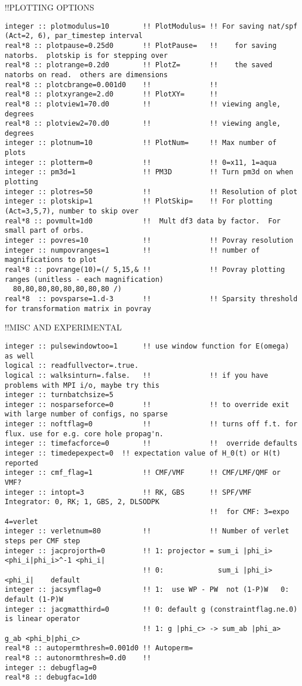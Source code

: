 !!{\large \quad PLOTTING OPTIONS }
\begin{verbatim}
integer :: plotmodulus=10        !! PlotModulus= !! For saving nat/spf (Act=2, 6), par_timestep interval
real*8 :: plotpause=0.25d0       !! PlotPause=   !!    for saving natorbs.  plotskip is for stepping over
real*8 :: plotrange=0.2d0        !! PlotZ=       !!    the saved natorbs on read.  others are dimensions
real*8 :: plotcbrange=0.001d0    !!              !!    
real*8 :: plotxyrange=2.d0       !! PlotXY=      !!    
real*8 :: plotview1=70.d0        !!              !! viewing angle, degrees
real*8 :: plotview2=70.d0        !!              !! viewing angle, degrees
integer :: plotnum=10            !! PlotNum=     !! Max number of plots
integer :: plotterm=0            !!              !! 0=x11, 1=aqua
integer :: pm3d=1                !! PM3D         !! Turn pm3d on when plotting
integer :: plotres=50            !!              !! Resolution of plot
integer :: plotskip=1            !! PlotSkip=    !! For plotting (Act=3,5,7), number to skip over
real*8 :: povmult=1d0            !!  Mult df3 data by factor.  For small part of orbs.
integer :: povres=10             !!              !! Povray resolution
integer :: numpovranges=1        !!              !! number of magnifications to plot
real*8 :: povrange(10)=(/ 5,15,& !!              !! Povray plotting ranges (unitless - each magnification)
  80,80,80,80,80,80,80,80 /)
real*8  :: povsparse=1.d-3       !!              !! Sparsity threshold for transformation matrix in povray
\end{verbatim}
!!{\large \quad MISC AND EXPERIMENTAL}
\begin{verbatim}
integer :: pulsewindowtoo=1      !! use window function for E(omega) as well
logical :: readfullvector=.true.
logical :: walksinturn=.false.   !!              !! if you have problems with MPI i/o, maybe try this
integer :: turnbatchsize=5
integer :: nosparseforce=0       !!              !! to override exit with large number of configs, no sparse
integer :: noftflag=0            !!              !! turns off f.t. for flux. use for e.g. core hole propag'n.
integer :: timefacforce=0        !!              !!  override defaults
integer :: timedepexpect=0  !! expectation value of H_0(t) or H(t) reported
integer :: cmf_flag=1            !! CMF/VMF      !! CMF/LMF/QMF or VMF?
integer :: intopt=3              !! RK, GBS      !! SPF/VMF Integrator: 0, RK; 1, GBS, 2, DLSODPK  
                                                 !!  for CMF: 3=expo 4=verlet
integer :: verletnum=80          !!              !! Number of verlet steps per CMF step
integer :: jacprojorth=0         !! 1: projector = sum_i |phi_i> <phi_i|phi_i>^-1 <phi_i|
                                 !! 0:             sum_i |phi_i> <phi_i|    default
integer :: jacsymflag=0          !! 1:  use WP - PW  not (1-P)W   0: default (1-P)W
integer :: jacgmatthird=0        !! 0: default g (constraintflag.ne.0) is linear operator
                                 !! 1: g |phi_c> -> sum_ab |phi_a> g_ab <phi_b|phi_c>
real*8 :: autopermthresh=0.001d0 !! Autoperm=
real*8 :: autonormthresh=0.d0    !! 
integer :: debugflag=0
real*8 :: debugfac=1d0
\end{verbatim}
